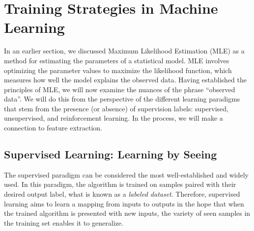 
\section{Training Strategies in Machine Learning}
\label{sec:training_paradigms}

In an earlier section, we discussed Maximum Likelihood Estimation (MLE) as a method for estimating the parameters of a statistical model. MLE involves optimizing the parameter values to maximize the likelihood function, which measures how well the model explains the observed data. Having established the principles of MLE, we will now examine the nuances of the phrase ``observed data''. We will do this from the perspective of the different learning paradigms that stem from the presence (or absence) of supervision labels: supervised, unsupervised, and reinforcement learning. In the process, we will make a connection to feature extraction.

\subsection{Supervised Learning: Learning by Seeing}
The supervised paradigm can be considered the most well-established and widely used. In this paradigm, the algorithm is trained on samples paired with their desired output label, what is known as a \textit{labeled dataset}. Therefore, supervised learning aims to learn a mapping from inputs to outputs in the hope that when the trained algorithm is presented with new inputs, the variety of seen samples in the training set enables it to generalize.

